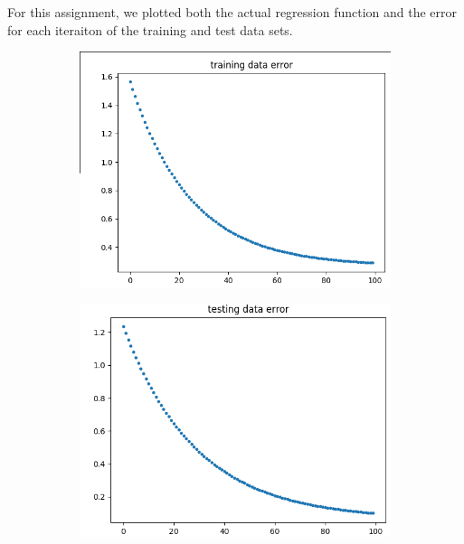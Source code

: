 \documentclass{article}
\begin{document}
				For this assignment, we plotted both the actual regression function and the error
				for each iteraiton of the training and test data sets.
				\begin{figure}[!ht]
					\centering
						\begin{subfigure}{0.4\linewidth}
						\includegraphics[width=\linewidth]{training_data_error.png}
					\end{subfigure}
					\begin{subfigure}{0.4\linewidth}
						\includegraphics[width=\linewidth]{testing_data_error.png}
					\end{subfigure}
				\end{figure}
\end{document}
